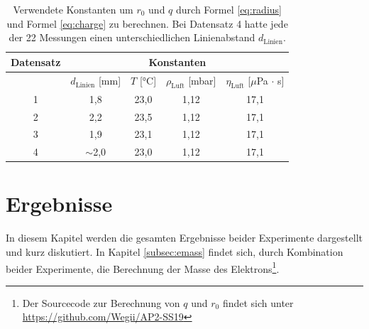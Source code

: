 \documentclass[a4paper,usenatbib]{aspdoc}
\begin{document}
                \begin{table}
                    \centering
                    \begin{tabular}{c|cccc}
                        \multicolumn{1}{c}{Datensatz} & \multicolumn{4}{c}{Konstanten} \\
                        \cmidrule(l){0-0}\cmidrule(lr){2-5}
                        \toprule
                         & $d_{\mathrm{Linien}}$ [mm]    & $T$ [°C]   & $\rho_{\mathrm{Luft}}$ [mbar]  & $\eta_{\mathrm{Luft}}$ [$\mu$Pa $\cdot$ s] \\ 
                            1   & 1,8     & 23,0        & 1,12     & 17,1\\ 
                            2   & 2,2     & 23,5        & 1,12     & 17,1 \\ 
                            3   & 1,9     & 23,1        & 1,12     & 17,1 \\ 
                            4   & $\sim$2,0    & 23,0   & 1,12  & 17,1  \\
                        \bottomrule
                    \end{tabular}
                    \caption{Verwendete Konstanten um $r_0$ und $q$ durch Formel \ref{eq:radius} und Formel \ref{eq:charge} zu berechnen. Bei Datensatz 4 hatte jede der 22 Messungen einen unterschiedlichen Linienabstand $d_{\mathrm{Linien}}$.}
                    \label{tab:config}
                \end{table}
    
    
    \section{Ergebnisse}\label{sec:result}
        In diesem Kapitel werden die gesamten Ergebnisse beider Experimente dargestellt und kurz diskutiert. In Kapitel \ref{subsec:emass} findet sich, durch Kombination beider Experimente, die Berechnung der Masse des Elektrons\footnote{Der Sourcecode zur Berechnung von $q$ und $r_0$ findet sich unter \url{https://github.com/Wegii/AP2-SS19}\label{note:source}}.
\end{document}
